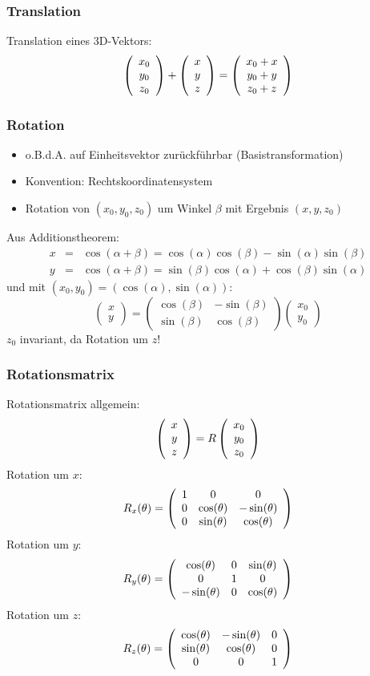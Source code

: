 \subsubsection*{Translation}

Translation eines 3D-Vektors: $$\left( \begin{array}{c} x_0 \\ y_0 \\ z_0 \end{array} \right) + \left( \begin{array}{c} x \\ y \\ z \end{array} \right) = \left( \begin{array}{c} x_0 + x \\ y_0 + y \\ z_0 + z \end{array} \right)$$

\subsubsection*{Rotation}

\begin{itemize}
\item o.B.d.A. auf Einheitsvektor zurückführbar (Basistransformation)
\item Konvention: Rechtskoordinatensystem
\item Rotation von $(x_0,y_0,z_0)$ um Winkel $\beta$ mit Ergebnis $(x,y,z_0)$
\end{itemize}
Aus Additionstheorem:
\begin{eqnarray*}
x &=& \cos(\alpha + \beta) = \cos(\alpha) \cos(\beta) - \sin(\alpha) \sin(\beta) \\ y &=& \cos(\alpha + \beta) = \sin(\beta) \cos(\alpha) + \cos(\beta) \sin(\alpha)
\end{eqnarray*}
und mit $(x_0,y_0) = (\cos(\alpha), \sin(\alpha))$:
$$\left( \begin{array}{c} x \\ y \end{array} \right) = \left( \begin{array}{rr} \cos(\beta) & -\sin(\beta) \\ \sin(\beta) & \cos(\beta) \end{array} \right) \left( \begin{array}{c} x_0 \\ y_0 \end{array} \right)$$
$z_0$ invariant, da Rotation um $z$!

\subsubsection*{Rotationsmatrix}

Rotationsmatrix allgemein: $$\left( \begin{array}{c} x \\ y \\ z \end{array} \right) = R \left( \begin{array}{c} x_0 \\ y_0 \\ z_0 \end{array} \right)$$
Rotation um $x$: $$R_x(\theta) = \left( \begin{array}{ccc} 1 & 0 & 0 \\ 0 & \cos(\theta) & - \sin(\theta) \\ 0 & \sin(\theta) & \cos(\theta) \end{array} \right)$$
Rotation um $y$: $$R_y(\theta) = \left( \begin{array}{ccc} \cos(\theta) & 0 & \sin(\theta) \\ 0 & 1 & 0 \\ - \sin(\theta) & 0 & \cos(\theta) \end{array} \right)$$
Rotation um $z$: $$R_z(\theta) = \left( \begin{array}{ccc} \cos(\theta) & - \sin(\theta) & 0 \\ \sin(\theta) & \cos(\theta) & 0 \\ 0 & 0 & 1 \end{array} \right)$$

